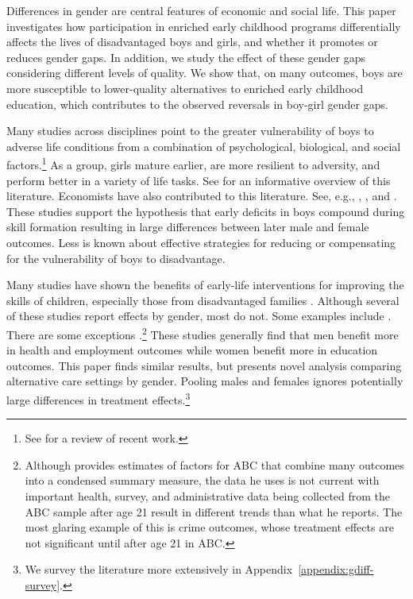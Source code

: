 Differences in gender are central features of economic and social life. This paper investigates how participation in enriched early childhood programs differentially affects the lives of disadvantaged boys and girls, and whether it promotes or reduces gender gaps. In addition, we study the effect of these gender gaps considering different levels of quality. We show that, on many outcomes, boys are more susceptible to lower-quality alternatives to enriched early childhood education, which contributes to the observed reversals in boy-girl gender gaps. 

Many studies across disciplines point to the greater vulnerability of boys to adverse life conditions from a combination of psychological, biological, and social factors.\footnote{See \citet{Golding_Fitzgerald_2017_IMHJ} for a review of recent work.} As a group, girls mature earlier, are more resilient to adversity, and perform better in a variety of life tasks. See \citet{Eliot_Brain_2009_BOOK,Schore_2017_IMHJ} for an informative overview of this literature. Economists have also contributed to this literature. See, e.g., \citet{Bertrand_Pan_2013_AEJAE}, \citet{Kottelenberg_Lehrer_2014_Gender-Effects}, and \citet{Autor-etal_2015_Family-Disadvantage}. These studies support the hypothesis that early deficits in boys compound during skill formation resulting in large differences between later male and female outcomes. Less is known about effective strategies for reducing or compensating for the vulnerability of boys to disadvantage.

Many studies have shown the benefits of early-life interventions for improving the skills of children, especially those from disadvantaged families \citep{Currie_2011_AER,Elango_Hojman_etal_2016_Early-Edu}. Although several of these studies report effects by gender, most do not. Some examples include \citet{Bernal_Keane_2011_JoLE,Cascio_Schanzenbach_2013_ImpactsExpandingAccess,Bitler_et_al_2014_Head_Start_Unpublished,Kline_Walters_2016_QJE}. There are some exceptions \citep{Anderson_2008_JASA,Heckman_Moon_etal_2010_QE,Campbell_Conti_etal_2014_EarlyChildhoodInvestments,Garcia_Heckman_Leaf_etal_2017_Comp_CBA_Unpublished}.\footnote{Although \citet{Anderson_2008_JASA} provides estimates of factors for ABC that combine many outcomes into a condensed summary measure, the data he uses is not current with important health, survey, and administrative data being collected from the ABC sample after age 21 result in different trends than what he reports. The most glaring example of this is crime outcomes, whose treatment effects are not significant until after age 21 in ABC.} These studies generally find that men benefit more in health and employment outcomes while women benefit more in education outcomes. This paper finds similar results, but presents novel analysis comparing alternative care settings by gender. Pooling males and females ignores potentially large differences in treatment effects.\footnote{We survey the literature more extensively in Appendix~\ref{appendix:gdiff-survey}.} 

